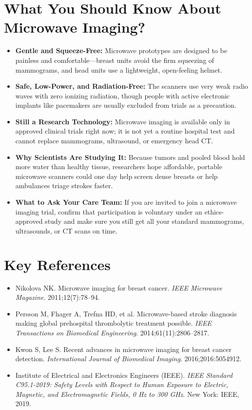 \section{What You Should Know About Microwave Imaging?}
\begin{itemize}
  \item \textbf{Gentle and Squeeze-Free:} Microwave prototypes are designed to be painless and comfortable---breast units avoid the firm squeezing of mammograms, and head units use a lightweight, open-feeling helmet.
  \item \textbf{Safe, Low-Power, and Radiation-Free:} The scanners use very weak radio waves with zero ionizing radiation, though people with active electronic implants like pacemakers are usually excluded from trials as a precaution.
  \item \textbf{Still a Research Technology:} Microwave imaging is available only in approved clinical trials right now; it is not yet a routine hospital test and cannot replace mammograms, ultrasound, or emergency head CT.
  \item \textbf{Why Scientists Are Studying It:} Because tumors and pooled blood hold more water than healthy tissue, researchers hope affordable, portable microwave scanners could one day help screen dense breasts or help ambulances triage strokes faster.
  \item \textbf{What to Ask Your Care Team:} If you are invited to join a microwave imaging trial, confirm that participation is voluntary under an ethics-approved study and make sure you still get all your standard mammograms, ultrasounds, or CT scans on time.
\end{itemize}

\section{Key References}
\begin{itemize}
  \item Nikolova NK. Microwave imaging for breast cancer. \emph{IEEE Microwave Magazine}. 2011;12(7):78--94.
  \item Persson M, Fhager A, Trefna HD, et al. Microwave-based stroke diagnosis making global prehospital thrombolytic treatment possible. \emph{IEEE Transactions on Biomedical Engineering}. 2014;61(11):2806--2817.
  \item Kwon S, Lee S. Recent advances in microwave imaging for breast cancer detection. \emph{International Journal of Biomedical Imaging}. 2016;2016:5054912.
  \item Institute of Electrical and Electronics Engineers (IEEE). \emph{IEEE Standard C95.1-2019: Safety Levels with Respect to Human Exposure to Electric, Magnetic, and Electromagnetic Fields, 0 Hz to 300 GHz}. New York: IEEE, 2019.
\end{itemize}

